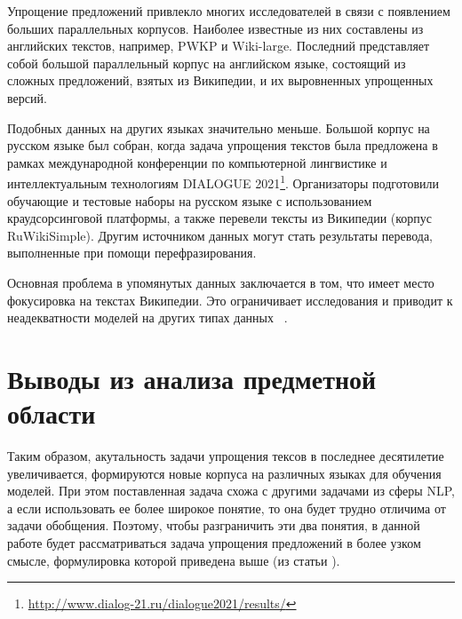 Упрощение предложений привлекло многих исследователей в связи с появлением больших параллельных корпусов. Наиболее известные из них составлены из английских текстов, например, PWKP и Wiki-large. Последний представляет собой большой параллельный корпус на английском языке, состоящий из сложных предложений, взятых из Википедии, и их выровненных упрощенных версий.

Подобных данных на других языках значительно меньше. Большой корпус на русском языке был собран, когда задача упрощения текстов была предложена в рамках международной конференции по компьютерной лингвистике и интеллектуальным технологиям DIALOGUE 2021\footnote{\url{http://www.dialog-21.ru/dialogue2021/results/}}. Организаторы подготовили обучающие и тестовые наборы на русском языке с использованием краудсорсинговой платформы, а также перевели тексты из Википедии (корпус RuWikiSimple). Другим источником данных могут стать результаты перевода, выполненные при помощи перефразирования\cite{kazan_federal_university}.  

Основная проблема в упомянутых данных заключается в том, что имеет место фокусировка на текстах Википедии. Это ограничивает исследования и приводит к неадекватности моделей на других типах данных ~\cite{kazan_federal_university}. 



\section*{Выводы из анализа предметной области}

Таким образом, акутальность задачи упрощения тексов в последнее десятилетие увеличивается, формируются новые корпуса на различных языках для обучения моделей.  При этом поставленная задача схожа с другими задачами из сферы NLP, а если использовать ее более широкое понятие, то она будет трудно отличима от задачи обобщения. Поэтому, чтобы разграничить эти два понятия, в данной работе будет рассматриваться задача упрощения предложений в более узком смысле, формулировка которой приведена выше (из статьи \cite{martin_muss_2021}).

